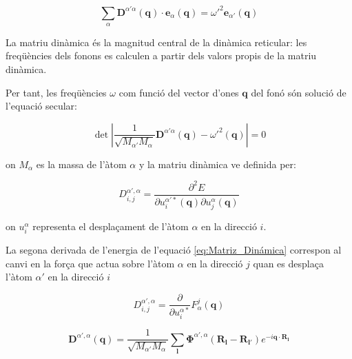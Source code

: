 \documentclass[12pt]{article} %
\let\vec\mathbf %
\begin{document}
\begin{equation}
\sum_{\alpha}\vec D^{\alpha'\alpha}(\vec q)\cdot\vec e_{\alpha}(\vec q)={\omega'}^{2}\vec e_{\alpha'}(\vec q)
\end{equation}   

La matriu dinàmica és la magnitud central de la dinàmica reticular: les freqüències dels fonons es calculen a partir dels valors propis de la matriu dinàmica.

Per tant, les freqüències $\omega$ com funció del vector d'ones $\vec q$ del fonó són solució de l'equació secular:

\begin{equation}
\label{eq:secular}
\det\left|\frac{1}{\sqrt{M_{\alpha'} M_{\alpha}}}\vec D^{\alpha'\alpha}\left(\vec q\right)-{\omega'}^2\left(\vec q\right)\right|=0 
\end{equation}

on $M_{\alpha}$ es la massa de l'àtom $\alpha$ y la matriu dinàmica ve definida per:

\begin{equation}
D^{\alpha',\alpha}_{i,j}=\frac{\partial^2 E}{\partial u^{\alpha'*}_i(\vec q)\partial u^{\alpha}_{j}(\vec q)}
\label{eq:Matriz_Dinámica}
\end{equation}

on $u^{\alpha}_{i}$ representa el despla\c{c}ament de l'àtom $\alpha$ en la direcció $i$.

La segona derivada de l'energia de l'equació \ref{eq:Matriz_Dinámica} correspon al canvi en la for\c{c}a que actua sobre l'àtom $\alpha$ en la direcció $j$ quan es despla\c{c}a l'àtom $\alpha'$ en la direcció $i$

\begin{equation}
D^{\alpha',\alpha}_{i,j}=\frac{\partial}{\partial u^{\alpha*}_{i}}F^{j}_{\alpha}(\vec q)
\end{equation}


\begin{equation}
 \label{eq:matriu_dinàmica}
 \boxed{
 \vec D^{\alpha',\alpha}(\vec q)=\frac{1}{\sqrt{M_{\alpha'} M_{\alpha}}}\sum_\vec l\vec\Phi^{\alpha',\alpha}\left(\vec R_\vec l-\vec R_{\vec l'}\right)e^{-i\vec q\cdot\vec R_\vec l}}
\end{equation}


\end{document}
